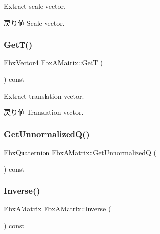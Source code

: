Extract scale vector. \begin{DoxyReturn}{戻り値}
Scale vector. 
\end{DoxyReturn}
\mbox{\label{class_fbx_a_matrix_adbf66581dbcec6acb82b3721a0394c88}} 
\subsubsection{\texorpdfstring{Get\+T()}{GetT()}}
{\footnotesize\ttfamily \hyperlink{class_fbx_vector4}{Fbx\+Vector4} Fbx\+A\+Matrix\+::\+GetT (\begin{DoxyParamCaption}{ }\end{DoxyParamCaption}) const}

Extract translation vector. \begin{DoxyReturn}{戻り値}
Translation vector. 
\end{DoxyReturn}
\mbox{\label{class_fbx_a_matrix_aa6c9cff20dd3d26d5df852705a0ee149}} 
\subsubsection{\texorpdfstring{Get\+Unnormalized\+Q()}{GetUnnormalizedQ()}}
{\footnotesize\ttfamily \hyperlink{class_fbx_quaternion}{Fbx\+Quaternion} Fbx\+A\+Matrix\+::\+Get\+UnnormalizedQ (\begin{DoxyParamCaption}{ }\end{DoxyParamCaption}) const}

\mbox{\label{class_fbx_a_matrix_a4093cf977851b49760e1c24c99d5bae7}} 
\subsubsection{\texorpdfstring{Inverse()}{Inverse()}}
{\footnotesize\ttfamily \hyperlink{class_fbx_a_matrix}{Fbx\+A\+Matrix} Fbx\+A\+Matrix\+::\+Inverse (\begin{DoxyParamCaption}{ }\end{DoxyParamCaption}) const}

